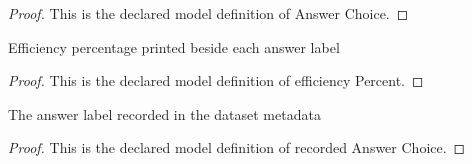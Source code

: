 \begin{proof}
  This is the declared model definition of Answer Choice.
\end{proof}
\begin{definition}
  \label{def:physics:phyx-mini-0474:phyxminiproblems-problemphyxmini0474-answerchoice-efficiencypercent}
  Efficiency percentage printed beside each answer label
\end{definition}
\begin{proof}
  This is the declared model definition of efficiency Percent.
\end{proof}
\begin{definition}
  \label{def:physics:phyx-mini-0474:phyxminiproblems-problemphyxmini0474-recordedanswerchoice}
  The answer label recorded in the dataset metadata
\end{definition}
\begin{proof}
  This is the declared model definition of recorded Answer Choice.
\end{proof}

